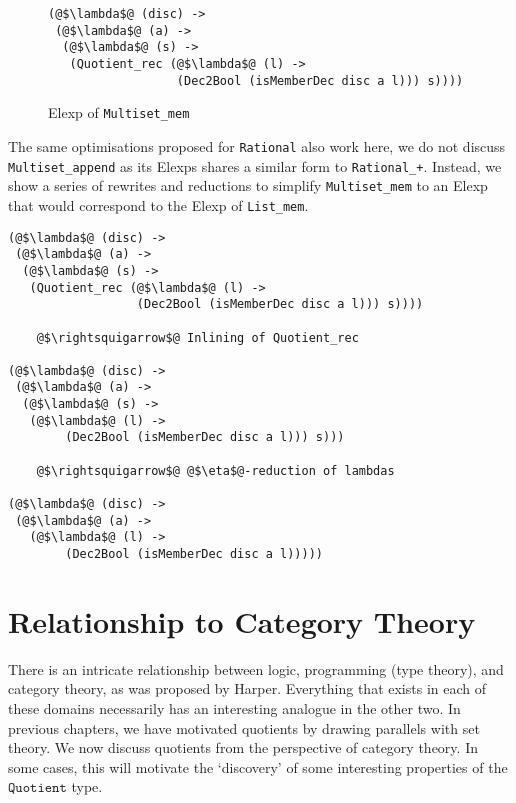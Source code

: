 \documentclass[12pt,twoside,maitrise]{dms}
\theoremstyle{definition}
\numberwithin{equation}{section}
\numberwithin{table}{chapter}
\numberwithin{figure}{chapter}
\newcommand\id[1] {\texttt{#1}}
\begin{document}
\begin{figure}
\begin{verbatim}
(@$\lambda$@ (disc) ->
 (@$\lambda$@ (a) ->
  (@$\lambda$@ (s) ->
   (Quotient_rec (@$\lambda$@ (l) ->
                  (Dec2Bool (isMemberDec disc a l))) s))))
\end{verbatim}
\caption{Elexp of \id{Multiset\_mem}}
\end{figure}

The same optimisations proposed for \id{Rational} also work here, we do not
discuss \id{Multiset\_append} as its Elexps shares a similar form to
\id{Rational\_+}. Instead, we show a series of rewrites and reductions to
simplify \id{Multiset\_mem} to an Elexp that would correspond to the Elexp of
\id{List\_mem}.

\begin{mdframed}
\begin{verbatim}
(@$\lambda$@ (disc) ->
 (@$\lambda$@ (a) ->
  (@$\lambda$@ (s) ->
   (Quotient_rec (@$\lambda$@ (l) ->
                  (Dec2Bool (isMemberDec disc a l))) s))))

    @$\rightsquigarrow$@ Inlining of Quotient_rec

(@$\lambda$@ (disc) ->
 (@$\lambda$@ (a) ->
  (@$\lambda$@ (s) ->
   (@$\lambda$@ (l) ->
        (Dec2Bool (isMemberDec disc a l))) s)))

    @$\rightsquigarrow$@ @$\eta$@-reduction of lambdas

(@$\lambda$@ (disc) ->
 (@$\lambda$@ (a) ->
   (@$\lambda$@ (l) ->
        (Dec2Bool (isMemberDec disc a l)))))

\end{verbatim}
\end{mdframed}

\chapter{Relationship to Category Theory}
There is an intricate relationship between logic, programming (type theory), and
category theory, as was proposed by Harper\cite{harpertrinity}. Everything that
exists in each of these domains necessarily has an interesting analogue in the
other two. In previous chapters, we have motivated quotients by drawing
parallels with set theory. We now discuss quotients from the perspective of
category theory. In some cases, this will motivate the `discovery' of some
interesting properties of the $\id{Quotient}$ type.
\end{document}
